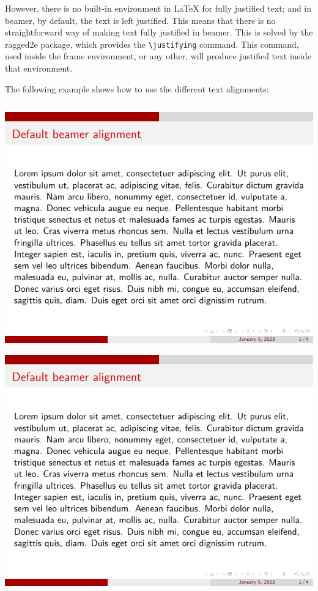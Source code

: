 However, there is no built-in environment in LaTeX for fully justified text; and in beamer, by default, the text is left justified. This means that there is no straightforward way of making text fully justified in beamer. This is solved by the ragged2e package, which provides the \verb|\justifying| command. This command, used inside the frame environment, or any other, will produce justified text inside that environment.

The following example shows how to use the different text alignments:

\inputminted[linenos=true]{latex}{examples/beamer/beamertextformat04.tex}

\includegraphics[page=1]{examples/beamer/beamertextformat04.pdf}

\includegraphics[page=2]{examples/beamer/beamertextformat04.pdf}

